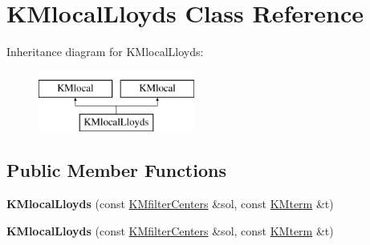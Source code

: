\hypertarget{class_k_mlocal_lloyds}{
\section{KMlocalLloyds Class Reference}
\label{class_k_mlocal_lloyds}
}
Inheritance diagram for KMlocalLloyds:\begin{figure}[H]
\begin{center}
\leavevmode
\includegraphics[height=2cm]{class_k_mlocal_lloyds}
\end{center}
\end{figure}
\subsection*{Public Member Functions}
\begin{DoxyCompactItemize}
\item 
\hypertarget{class_k_mlocal_lloyds_a5f13de9a691025992079c9bc774446b6}{
{\bfseries KMlocalLloyds} (const \hyperlink{class_k_mfilter_centers}{KMfilterCenters} \&sol, const \hyperlink{class_k_mterm}{KMterm} \&t)}
\label{class_k_mlocal_lloyds_a5f13de9a691025992079c9bc774446b6}

\item 
\hypertarget{class_k_mlocal_lloyds_a5f13de9a691025992079c9bc774446b6}{
{\bfseries KMlocalLloyds} (const \hyperlink{class_k_mfilter_centers}{KMfilterCenters} \&sol, const \hyperlink{class_k_mterm}{KMterm} \&t)}
\label{class_k_mlocal_lloyds_a5f13de9a691025992079c9bc774446b6}

\end{DoxyCompactItemize}
